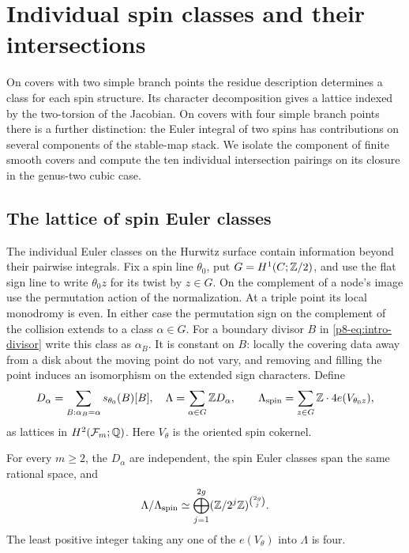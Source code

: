 \section{Individual spin classes and their intersections}\label{sec:individual}
On covers with two simple branch points the residue description determines a class for each spin structure. Its character decomposition gives a lattice indexed by the two-torsion of the Jacobian. On covers with four simple branch points there is a further distinction: the Euler integral of two spins has contributions on several components of the stable-map stack. We isolate the component of finite smooth covers and compute the ten individual intersection pairings on its closure in the genus-two cubic case.
\subsection{The lattice of spin Euler classes}\label{p8-sec:lattice}
The individual Euler classes on the Hurwitz surface contain
information beyond their pairwise integrals. Fix a spin line
$\theta_0$, put $G=H^1(C;\mathbb Z/2)$, and use the flat sign line to
write $\theta_0 z$ for its twist by $z\in G$. On the complement of
a node's image use the permutation action of the normalization.
At a triple point its local monodromy is even. In either case the
permutation sign on the complement of the collision extends to a
class $\alpha\in G$. For a boundary divisor $B$ in
\eqref{p8-eq:intro-divisor} write this class as $\alpha_B$. It is
constant on $B$: locally the covering data away from a disk about
the moving point do not vary, and removing and filling the point
induces an isomorphism on the extended sign characters.
Define
\[
 D_\alpha=\sum_{B:\alpha_B=\alpha} s_{\theta_0}(B)[B],
 \quad
 \Lambda=\sum_{\alpha\in G}\mathbb Z D_\alpha,\qquad
 \Lambda_{\rm spin}=\sum_{z\in G} \mathbb Z\cdot4e(V_{\theta_0 z}),
\]
as lattices in $H^2(\mathcal F_m;\mathbb Q)$. Here $V_\theta$ is the
oriented spin cokernel.
\begin{theorem}\label{p8-thm:lattice}
For every $m\ge2$, the $D_\alpha$ are independent, the spin Euler
classes span the same rational space, and
\[
     \Lambda/\Lambda_{\rm spin}
          \simeq \bigoplus_{j=1}^{2g}
               (\mathbb Z/2^j\mathbb Z)^{\binom{2g}{j}}.
\]
The least positive integer taking any one of the $e(V_\theta)$
into $\Lambda$ is four.
\end{theorem}
